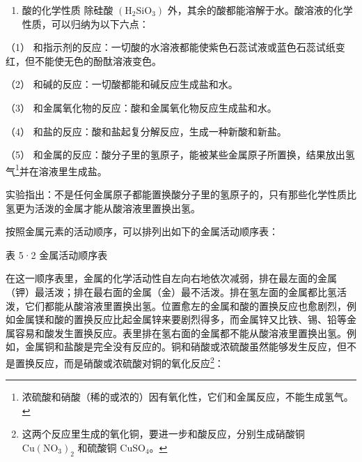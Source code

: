 \begin{enumerate}
\item
  酸的化学性质 除硅酸 \(\left(\mathrm{H}_{2}\mathrm{SiO}_{3}\right)\)
  外，其余的酸都能溶解于水。酸溶液的化学性质，可以归纳为以下六点：
\end{enumerate}

（1）
和指示剂的反应：一切酸的水溶液都能使紫色石蕊试液或蓝色石蕊试纸变红，但不能使无色的酚酞溶液变色。

（2） 和碱的反应：一切酸都能和碱反应生成盐和水。

（3） 和金属氧化物的反应：酸和金属氧化物反应生成盐和水。

（4） 和盐的反应：酸和盐起复分解反应，生成一种新酸和新盐。

（5）
和金属的反应：酸分子里的氢原子，能被某些金属原子所置换，结果放出氢气\footnote{浓硫酸和硝酸（稀的或浓的）因有氧化性，它们和金属反应，不能生成氢气。}并在溶液里生成盐。

实验指出：不是任何金属原子都能置换酸分子里的氢原子的，只有那些化学性质比氢更为活泼的金属才能从酸溶液里置换出氢。

按照金属元素的活动顺序，可以排列出如下的金属活动顺序表：

表 5·2 金属活动顺序表

{\centering
\scriptsize\setlength{\tabcolsep}{2.2pt}%
\par
}

在这一顺序表里，金属的化学活动性自左向右地依次减弱，排在最左面的金属（钾）最活泼；排在最右面的金属（金）最不活泼。排在氢左面的金属都比氢活泼，它们都能从酸溶液里置换出氢。位置愈左的金属和酸的置换反应也愈剧烈，例如金属镁和酸的置换反应比起金属锌来要剧烈得多，而金属锌又比铁、锡、铅等金属容易和酸发生置换反应。表里排在氢右面的金属都不能从酸溶液里置换出氢。例如，金属铜和盐酸是完全没有反应的。铜和硝酸或浓硫酸虽然能够发生反应，但不是置换反应，而是硝酸或浓硫酸对铜的氧化反应\footnote{这两个反应里生成的氧化铜，要进一步和酸反应，分别生成硝酸铜
  \(\mathrm{Cu(NO_3)_2}\) 和硫酸铜 \(\mathrm{CuSO_4}\)。}：

